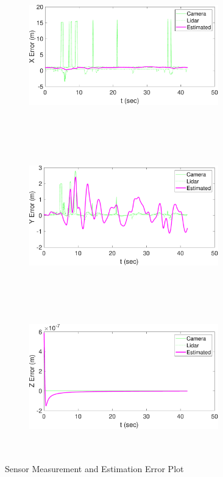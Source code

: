 \begin{figure}
    \centering
    \begin{subfigure}
        \centering
        \includegraphics[height=6.5cm,width=0.9\textwidth]{Images/X_error.pdf}
    \end{subfigure}
    \begin{subfigure}
        \centering
        \includegraphics[height=6.5cm,width=0.9\textwidth]{Images/Y_error.pdf}
    \end{subfigure}
    \begin{subfigure}
        \centering
        \includegraphics[height=6.5cm,width=0.9\textwidth]{Images/Z_error.pdf}
    \end{subfigure}
    \caption{Sensor Measurement and Estimation Error Plot}
    \label{Residue_error_plot}
\end{figure}


